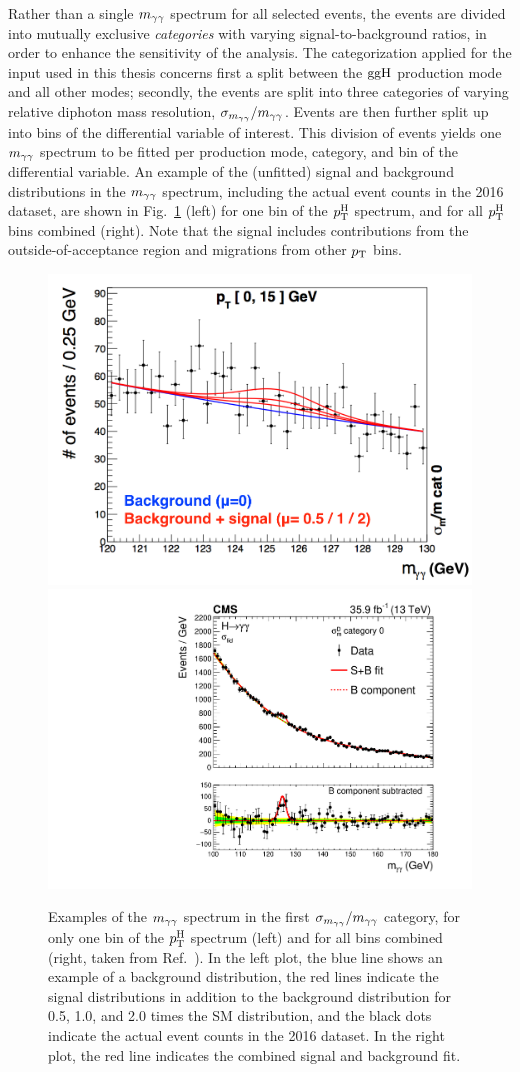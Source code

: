 Rather than a single $m_{\mathrm{\gamma}\mathrm{\gamma}}$ spectrum for all selected events, the events are divided into mutually exclusive \textit{categories} with varying signal-to-background ratios, in order to enhance the sensitivity of the analysis.
% 
The categorization applied for the input used in this thesis concerns first a split between the $\mathrm{g}\mathrm{g}\mathrm{H}$ production mode and all other modes; secondly, the events are split into three categories of varying relative diphoton mass resolution, $\sigma_{m_{\mathrm{\gamma}\mathrm{\gamma}}} / m_{\mathrm{\gamma}\mathrm{\gamma}}$.
% 
Events are then further split up into bins of the differential variable of interest.
% 
This division of events yields one $m_{\mathrm{\gamma}\mathrm{\gamma}}$ spectrum to be fitted per production mode, category, and bin of the differential variable.
% 
An example of the (unfitted) signal and background distributions in the $m_{\mathrm{\gamma}\mathrm{\gamma}}$ spectrum, including the actual event counts in the 2016 dataset, are shown in Fig.~\ref{fig:example_mgg} (left) for one bin of the $p_\mathrm{T}^\mathrm{H}$ spectrum, and for all $p_\mathrm{T}^\mathrm{H}$ bins combined (right).
% 
Note that the signal includes contributions from the outside-of-acceptance region and migrations from other $p_\mathrm{T}$ bins.

\begin{figure}[hbtp]
  \begin{center}
    \includegraphics[width=0.49\linewidth]{img/inputs/hgg/example_mgg.png}
    \includegraphics[width=0.49\linewidth]{img/inputs/hgg/example_mgg_allbins.pdf}
    \caption{
        Examples of the $m_{\mathrm{\gamma}\mathrm{\gamma}}$ spectrum in the first $\sigma_{m_{\mathrm{\gamma}\mathrm{\gamma}}} / m_{\mathrm{\gamma}\mathrm{\gamma}}$ category, for only one bin of the $p_\mathrm{T}^\mathrm{H}$ spectrum (left) and for all bins combined (right, taken from Ref.~\cite{Sirunyan:2018kta}).
        In the left plot, the blue line shows an example of a background distribution, the red lines indicate the signal distributions in addition to the background distribution for 0.5, 1.0, and 2.0 times the SM distribution, and the black dots indicate the actual event counts in the 2016 dataset.
        In the right plot, the red line indicates the combined signal and background fit.
        }
    \label{fig:example_mgg}
  \end{center}
\end{figure}


